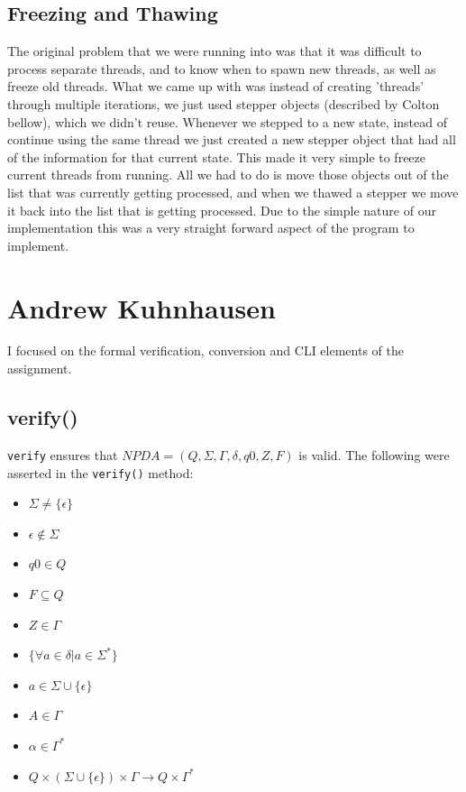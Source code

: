 \documentclass[a4paper]{article}
\begin{document}
\subsection{Freezing and Thawing}
The original problem that we were running into was that it was difficult to process
separate threads, and to know when to spawn new threads, as well as freeze old threads.
What we came up with was instead of creating 'threads' through multiple iterations, we just
used stepper objects (described by Colton bellow), which we didn't reuse. Whenever we
stepped to a new state, instead of continue using the same thread we just created a new
stepper object that had all of the information for that current state. This made it
very simple to freeze current threads from running. All we had to do is move those
objects out of the list that was currently getting processed, and when we thawed a
stepper we move it back into the list that is getting processed. Due to the simple
nature of our implementation this was a very straight forward aspect of the program
to implement.
\section{Andrew Kuhnhausen}
I focused on the formal verification, conversion and CLI elements of the
assignment.
\subsection{verify()}
\texttt{verify} ensures that $NPDA=(Q,\Sigma,\Gamma,\delta,q0,Z,F)$ is valid.
The following were asserted in the \texttt{verify()} method:
\begin{itemize}
    \item $\Sigma \ne \{\epsilon\}$
    \item $\epsilon \notin \Sigma$
    \item $q0\in Q$
    \item $F \subseteq Q$
    \item $Z \in \Gamma$
    \item $\{\forall a \in \delta | a \in \Sigma^{*}\}$
    \item $a\in\Sigma\cup\{\epsilon\}$
    \item $A\in\Gamma$
    \item $\alpha\in\Gamma^{*}$
    \item $Q\times(\Sigma\cup\{\epsilon\})\times\Gamma\rightarrow Q\times\Gamma^{*}$
\end{itemize}
\end{document}
